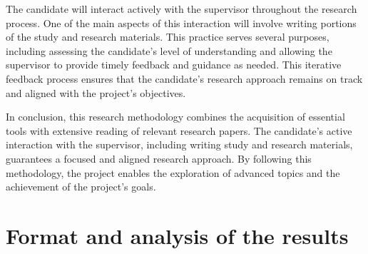 \documentclass[12pt]{article}
\begin{document}
The candidate will interact actively with the supervisor throughout the research process. 
One of the main aspects of this interaction will involve writing portions of the study and research materials. 
This practice serves several purposes, including assessing the candidate’s level of understanding and allowing the supervisor to provide timely feedback and guidance as needed. 
This iterative feedback process ensures that the candidate’s research approach remains on track and aligned with the project’s objectives.

In conclusion, this research methodology combines the acquisition of essential tools with extensive reading of relevant research papers. 
The candidate’s active interaction with the supervisor, including writing study and research materials, guarantees a focused and aligned research approach. 
By following this methodology, the project enables the exploration of advanced topics and the achievement of the project’s goals.

\section{Format and analysis of the results}
\end{document}
